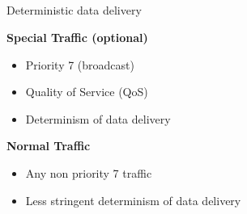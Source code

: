 \documentclass[compress,red]{beamer}
\begin{document}
\subsection{}
\begin{frame}{Deterministic data delivery}


    \begin{block}{{\bf Special Traffic ({\bf optional})}}
    \begin{itemize}
      \item Priority 7 (broadcast)  
      \item Quality of Service (QoS)
      \item Determinism of data delivery
    \end{itemize}
    \end{block}



\hspace{4cm}
    \begin{block}{ {\bf Normal Traffic}}
    \begin{itemize}
      \item Any non priority 7 traffic 
      \item Less stringent determinism of data delivery
    \end{itemize}   
    \end{block}


% 

\end{frame}
\end{document}
